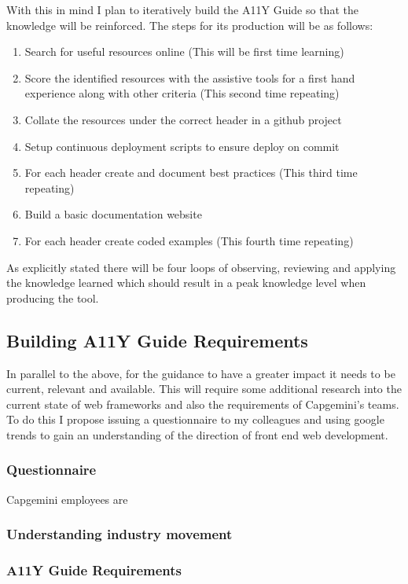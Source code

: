 With this in mind I plan to iteratively build the A11Y Guide so
that the knowledge will be reinforced. The steps for its production will be
as follows:
\begin{enumerate}
  \item Search for useful resources online (This will be first time learning)
  \item Score the identified resources with the assistive tools for a first hand
  experience along with other criteria (This second time repeating)
  \item Collate the resources under the correct header in a github project
  \item Setup continuous deployment scripts to ensure deploy on commit
  \item For each header create and document best practices (This third time
  repeating)
  \item Build a basic documentation website
  \item For each header create coded examples (This fourth time repeating)
\end{enumerate}

As explicitly stated there will be four loops of observing, reviewing and
applying the knowledge learned which should result in a peak knowledge level
when producing the tool.

\subsection{Building A11Y Guide Requirements}
In parallel to the above, for the guidance to have a greater impact it
needs to be current, relevant and available. This will require some additional
research into the current state of web frameworks and also the
requirements of Capgemini's teams. To do this I propose issuing a questionnaire to my
colleagues and using google trends to gain an understanding of the direction
of front end web development.

\subsubsection{Questionnaire}
Capgemini employees are

\subsubsection{Understanding industry movement}
\subsubsection{A11Y Guide Requirements}

